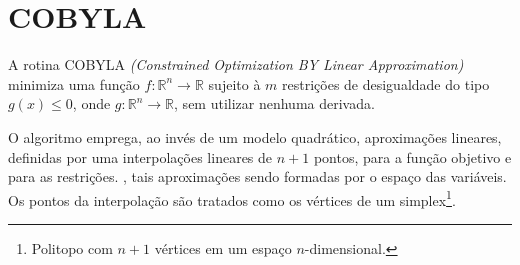 %
%
%

\section{COBYLA} \label{cobyla}
A rotina COBYLA \emph{(Constrained Optimization BY Linear Approximation)}
minimiza uma função $f: \mathbb{R}^n \to \mathbb{R}$ sujeito à $m$ restrições de
desigualdade do tipo $g(x) \leq 0$, onde $g: \mathbb{R}^n \to \mathbb{R}$, sem
utilizar nenhuma derivada.

O algoritmo emprega, ao invés de um modelo quadrático, aproximações lineares,
definidas por uma interpolações lineares de $n+1$ pontos, para a função objetivo
e para as restrições. , tais aproximações sendo formadas por o espaço das
variáveis. Os pontos da interpolação são tratados
como os vértices de um simplex\footnote{Politopo com $n+1$ vértices em um
espaço $n$-dimensional.}.

% 
% 

